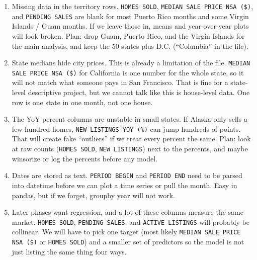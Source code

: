 \documentclass[12pt]{article}
\begin{document}
\begin{enumerate}
\item Missing data in the territory rows. \texttt{HOMES SOLD}, \texttt{MEDIAN SALE PRICE NSA (\$)}, and \texttt{PENDING SALES} are blank for most Puerto Rico months and some Virgin Islands / Guam months. If we leave those in, means and year-over-year plots will look broken. Plan: drop Guam, Puerto Rico, and the Virgin Islands for the main analysis, and keep the 50 states plus D.C. (``Columbia'' in the file).

\item State medians hide city prices. This is already a limitation of the file. \texttt{MEDIAN SALE PRICE NSA (\$)} for California is one number for the whole state, so it will not match what someone pays in San Francisco. That is fine for a state-level descriptive project, but we cannot talk like this is house-level data. One row is one state in one month, not one house.

\item The YoY percent columns are unstable in small states. If Alaska only sells a few hundred homes, \texttt{NEW LISTINGS YOY (\%)} can jump hundreds of points. That will create fake ``outliers'' if we treat every percent the same. Plan: look at raw counts (\texttt{HOMES SOLD}, \texttt{NEW LISTINGS}) next to the percents, and maybe winsorize or log the percents before any model.

\item Dates are stored as text. \texttt{PERIOD BEGIN} and \texttt{PERIOD END} need to be parsed into datetime before we can plot a time series or pull the month. Easy in pandas, but if we forget, groupby year will not work.

\item Later phases want regression, and a lot of these columns measure the same market. \texttt{HOMES SOLD}, \texttt{PENDING SALES}, and \texttt{ACTIVE LISTINGS} will probably be collinear. We will have to pick one target (most likely \texttt{MEDIAN SALE PRICE NSA (\$)} or \texttt{HOMES SOLD}) and a smaller set of predictors so the model is not just listing the same thing four ways.
\end{enumerate}
\end{document}
